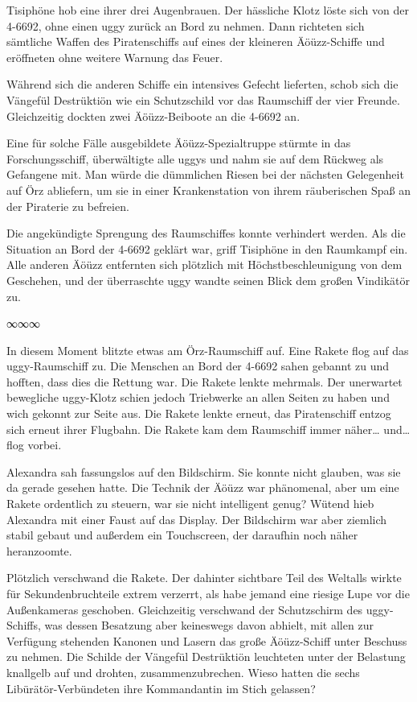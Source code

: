 Tisiphöne hob eine ihrer drei Augenbrauen. Der hässliche Klotz löste sich von der 4-6692, ohne einen uggy zurück an Bord zu nehmen. Dann richteten sich sämtliche Waffen des Piratenschiffs auf eines der kleineren Äöüzz-Schiffe und eröffneten ohne weitere Warnung das Feuer.

Während sich die anderen Schiffe ein intensives Gefecht lieferten, schob sich die Vängefül Destrüktiön wie ein Schutzschild vor das Raumschiff der vier Freunde. Gleichzeitig dockten zwei Äöüzz-Beiboote an die 4-6692 an.

Eine für solche Fälle ausgebildete Äöüzz-Spezialtruppe stürmte in das Forschungsschiff, überwältigte alle uggys und nahm sie auf dem Rückweg als Gefangene mit. Man würde die dümmlichen Riesen bei der nächsten Gelegenheit auf Örz abliefern, um sie in einer Krankenstation von ihrem räuberischen Spaß an der Piraterie zu befreien.

Die angekündigte Sprengung des Raumschiffes konnte verhindert werden. Als die Situation an Bord der 4-6692 geklärt war, griff Tisiphöne in den Raumkampf ein. Alle anderen Äöüzz entfernten sich plötzlich mit Höchstbeschleunigung von dem Geschehen, und der überraschte uggy wandte seinen Blick dem großen Vindikätör zu.

\begin{center}
    ∞∞∞
\end{center}

In diesem Moment blitzte etwas am Örz-Raumschiff auf. Eine Rakete flog auf das uggy-Raumschiff zu. Die Menschen an Bord der 4-6692 sahen gebannt zu und hofften, dass dies die Rettung war. Die Rakete lenkte mehrmals. Der unerwartet bewegliche uggy-Klotz schien jedoch Triebwerke an allen Seiten zu haben und wich gekonnt zur Seite aus. Die Rakete lenkte erneut, das Piratenschiff entzog sich erneut ihrer Flugbahn. Die Rakete kam dem Raumschiff immer näher… und… flog vorbei.

Alexandra sah fassungslos auf den Bildschirm. Sie konnte nicht glauben, was sie da gerade gesehen hatte. Die Technik der Äöüzz war phänomenal, aber um eine Rakete ordentlich zu steuern, war sie nicht intelligent genug? Wütend hieb Alexandra mit einer Faust auf das Display. Der Bildschirm war aber ziemlich stabil gebaut und außerdem ein Touchscreen, der daraufhin noch näher heranzoomte.

Plötzlich verschwand die Rakete. Der dahinter sichtbare Teil des Weltalls wirkte für Sekundenbruchteile extrem verzerrt, als habe jemand eine riesige Lupe vor die Außenkameras geschoben. Gleichzeitig verschwand der Schutzschirm des uggy-Schiffs, was dessen Besatzung aber keineswegs davon abhielt, mit allen zur Verfügung stehenden Kanonen und Lasern das große Äöüzz-Schiff unter Beschuss zu nehmen. Die Schilde der Vängefül Destrüktiön leuchteten unter der Belastung knallgelb auf und drohten, zusammenzubrechen. Wieso hatten die sechs Libürätör-Verbündeten ihre Kommandantin im Stich gelassen?


